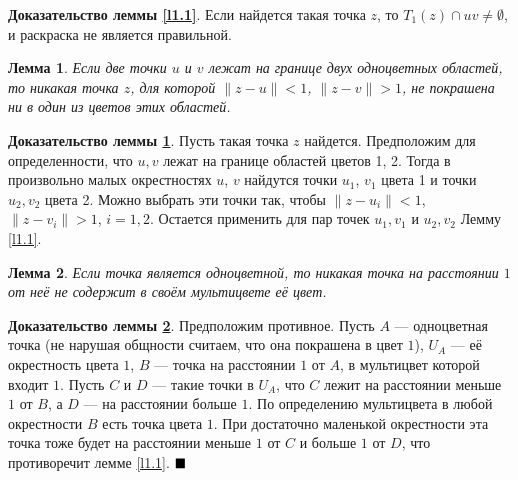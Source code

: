 \documentclass[12pt,a4paper]{article}
\newtheorem{lemma}{Лемма}
\renewcommand{\qed}{$\blacksquare \vspace{5mm}$}
\begin{document}
\textbf{Доказательство леммы \ref{l1.1}}. Если найдется такая точка $z$, то $T_1(z) \cap uv \neq \emptyset$, и раскраска не является правильной.%


\begin{lemma} \label{l1.2}
	Если две точки $u$ и $v$ лежат на границе двух одноцветных областей, то никакая точка $z$, для которой $\|z-u\|<1$, $\|z-v\|>1$, не покрашена ни в один из цветов этих областей.
\end{lemma}

\textbf{Доказательство леммы \ref{l1.2}}. Пусть такая точка $z$ найдется. Предположим для определенности, что $u,v$ лежат на границе областей цветов 1, 2.  Тогда в произвольно малых окрестностях $u$, $v$ найдутся точки $u_1$, $v_1$ цвета 1 и точки $u_2, v_2$ цвета 2. Можно выбрать эти точки так, чтобы $\|z-u_i\|<1$, $\|z-v_i\|>1$, $i=1,2$. Остается применить для пар точек $u_1, v_1$ и $u_2, v_2$ Лемму \ref{l1.1}. %

\begin{lemma} \label{l1.3}
	Если точка является одноцветной, то никакая точка на расстоянии $1$ от неё не содержит в своём мультицвете её цвет.
\end{lemma}

\textbf{Доказательство леммы \ref{l1.3}}. Предположим противное. Пусть $A$ --- одноцветная точка (не нарушая общности считаем, что она покрашена в цвет $1$), $U_A$ --- её окрестность цвета $1$, $B$ --- точка на расстоянии $1$ от $A$, в мультицвет которой входит $1$. Пусть $C$ и $D$ --- такие точки в $U_A$, что $C$ лежит на расстоянии меньше $1$ от $B$, а $D$ --- на расстоянии больше $1$. По определению мультицвета в любой окрестности $B$ есть точка цвета $1$. При достаточно маленькой окрестности эта точка тоже будет на расстоянии меньше $1$ от $C$ и больше $1$ от $D$, что противоречит лемме \ref{l1.1}. \qed
\end{document}
